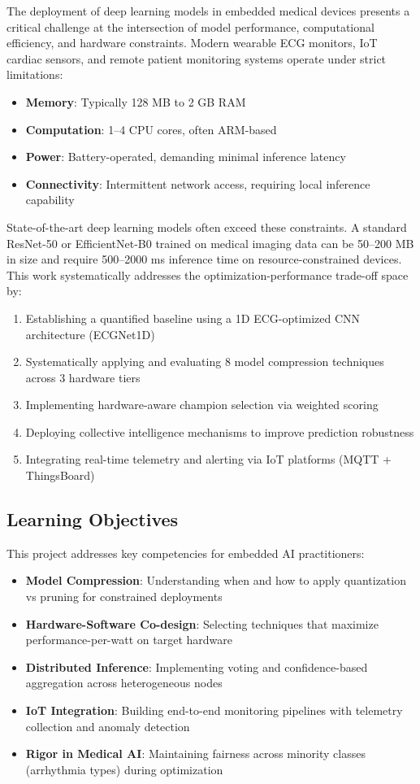 \documentclass[12pt, a4paper]{article}
\begin{document}
The deployment of deep learning models in embedded medical devices presents a critical challenge at the intersection of model performance, computational efficiency, and hardware constraints. Modern wearable ECG monitors, IoT cardiac sensors, and remote patient monitoring systems operate under strict limitations:
\begin{itemize}
    \item \textbf{Memory}: Typically 128 MB to 2 GB RAM
    \item \textbf{Computation}: 1–4 CPU cores, often ARM-based
    \item \textbf{Power}: Battery-operated, demanding minimal inference latency
    \item \textbf{Connectivity}: Intermittent network access, requiring local inference capability
\end{itemize}

State-of-the-art deep learning models often exceed these constraints. A standard ResNet-50 or EfficientNet-B0 trained on medical imaging data can be 50–200 MB in size and require 500–2000 ms inference time on resource-constrained devices. This work systematically addresses the optimization-performance trade-off space by:

\begin{enumerate}
    \item Establishing a quantified baseline using a 1D ECG-optimized CNN architecture (ECGNet1D)
    \item Systematically applying and evaluating 8 model compression techniques across 3 hardware tiers
    \item Implementing hardware-aware champion selection via weighted scoring
    \item Deploying collective intelligence mechanisms to improve prediction robustness
    \item Integrating real-time telemetry and alerting via IoT platforms (MQTT + ThingsBoard)
\end{enumerate}

\subsection{Learning Objectives}

This project addresses key competencies for embedded AI practitioners:
\begin{itemize}
    \item \textbf{Model Compression}: Understanding when and how to apply quantization vs pruning for constrained deployments
    \item \textbf{Hardware-Software Co-design}: Selecting techniques that maximize performance-per-watt on target hardware
    \item \textbf{Distributed Inference}: Implementing voting and confidence-based aggregation across heterogeneous nodes
    \item \textbf{IoT Integration}: Building end-to-end monitoring pipelines with telemetry collection and anomaly detection
    \item \textbf{Rigor in Medical AI}: Maintaining fairness across minority classes (arrhythmia types) during optimization
\end{itemize}
\end{document}
